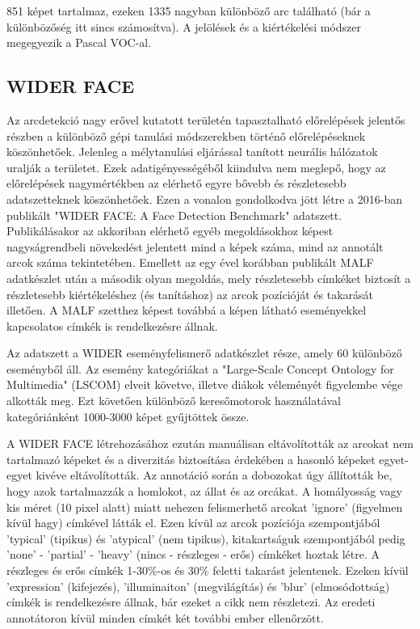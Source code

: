 851 képet tartalmaz, ezeken 1335 nagyban különböző arc található (bár a különbözőség itt sincs számosítva). A jelölések és a kiértékelési módszer megegyezik a Pascal VOC-al.

\subsection{WIDER FACE}
Az arcdetekció nagy erővel kutatott területén tapasztalható előrelépések jelentős részben a különböző gépi tanulási módszerekben történő előrelépéseknek köszönhetőek. Jelenleg a mélytanulási eljárással tanított neurális hálózatok uralják a területet. Ezek adatigényességéből kiindulva nem meglepő, hogy az előrelépések nagymértékben az elérhető egyre bővebb és részletesebb adatszetteknek köszönhetőek. Ezen a vonalon gondolkodva jött létre a 2016-ban publikált "WIDER FACE: A Face Detection Benchmark" \cite{yang_wider_2016} adatszett. Publikálásakor az akkoriban elérhető egyéb megoldásokhoz képest nagyságrendbeli növekedést jelentett mind a képek száma, mind az annotált arcok száma tekintetében. Emellett az egy ével korábban publikált MALF \cite{bin_yang_fine-grained_2015} adatkészlet után a második olyan megoldás, mely részletesebb címkéket biztosít a részletesebb kiértékeléshez (és tanításhoz) az arcok pozícióját és takarását illetően. A MALF szetthez képest továbbá a képen látható eseményekkel kapcsolatos címkék is rendelkezésre állnak.

Az adatszett a WIDER eseményfelismerő adatkészlet része, amely 60 különböző eseményből áll. Az esemény kategóriákat a "Large-Scale Concept Ontology for Multimedia" (LSCOM) \cite{naphade_large-scale_2006} elveit követve, illetve diákok véleményét figyelembe vége alkották meg. Ezt követően különböző keresőmotorok használatával kategóriánként 1000-3000 képet gyűjtöttek össze.

A WIDER FACE létrehozásához ezután manuálisan eltávolították az arcokat nem tartalmazó képeket és a diverzitás biztosítása érdekében a hasonló képeket egyet-egyet kivéve eltávolították. Az annotáció során a dobozokat úgy állították be, hogy azok tartalmazzák a homlokot, az állat és az orcákat. A homályosság vagy kis méret (10 pixel alatt) miatt nehezen felismerhető arcokat 'ignore' (figyelmen kívül hagy) címkével látták el. Ezen kívül az arcok pozíciója szempontjából 'typical' (tipikus) és 'atypical' (nem tipikus), kitakartságuk szempontjából pedig 'none' - 'partial' - 'heavy' (nincs - részleges - erős) címkéket hoztak létre. A részleges és erős címkék 1-30\%-os és 30\% feletti takarást jelentenek. Ezeken kívül 'expression' (kifejezés), 'illuminaiton' (megvilágítás) és 'blur' (elmosódottság) címkék is rendelkezésre állnak, bár ezeket a cikk nem részletezi. Az eredeti annotátoron kívül minden címkét két további ember ellenőrzött.

